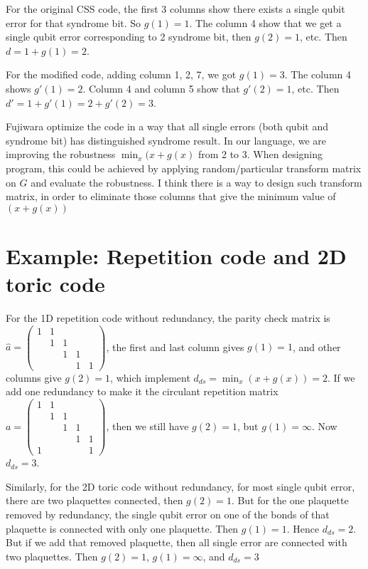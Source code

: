 \documentclass[aps,prb,12pt,tightenlines,%
notitlepage,longbibliography]{revtex4-1}
\begin{document}
For the original CSS code, the first 3 columns show there exists a single qubit error for that syndrome bit. So $g(1)=1$.  The column 4 show that we get a single qubit error corresponding to 2 syndrome bit, then $g(2)=1$, etc. Then $d=1+g(1)=2$. 

For the modified code, adding column 1, 2, 7, we got $g(1)=3$. The column 4 shows $g'(1)=2$. Column 4 and column 5 show that $g'(2)=1$, etc. Then $d'=1+g'(1)=2+g'(2)=3$.

Fujiwara optimize the code in a way that all single errors (both qubit and syndrome bit) has distinguished syndrome result. In our language, we are improving the robustness $\min_x (x+g(x)$ from 2 to 3. When designing program, this could be achieved by applying random/particular transform matrix on $G$ and evaluate the robustness. I think there is a way to design such transform matrix, in order to eliminate those columns that give the minimum value of $(x+g(x))$


\section{Example: Repetition code and 2D toric code}
For the 1D repetition code without redundancy, the parity check matrix is
$\hat a=\left( \begin{array}{ccccc}1 & 1 \\  & 1 & 1 & \\ &&1 &1\\ &&&1&1\end{array} \right)$, the first and last column gives $g(1)=1$, and other columns give $g(2)=1$, which implement $d_{ds}=\min_x(x+g(x))=2$. If we add one redundancy to make it the circulant repetition matrix $a=\left( \begin{array}{ccccc}1 & 1 \\  & 1 & 1 & \\ &&1 &1\\ &&&1&1\\ 1 &&&&1\end{array} \right)$, then we still have $g(2)=1$, but $g(1)=\infty$. Now $d_{ds}=3$.

Similarly, for the 2D toric code without redundancy, for most single qubit error, there are two plaquettes connected, then $g(2)=1$. But for the one plaquette removed by redundancy, the single qubit error on one of the bonds of that plaquette is connected with only one plaquette. Then $g(1)=1$. Hence $d_{ds}=2$. But if we add that removed plaquette, then all single error are connected with two plaquettes. Then $g(2)=1$, $g(1)=\infty$, and $d_{ds}=3$
\end{document}

